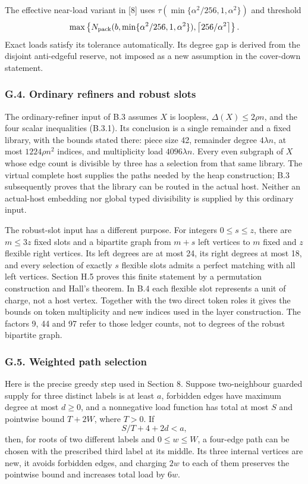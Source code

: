 \documentclass[english,11pt,a4paper]{article}
\begin{document}
The effective near-load variant in {[}8{]} uses \(\tau(\min\{\alpha^2/256,1,\alpha^2\})\) and threshold \[\max\left\{N_{\rm pack}(b,\min\{\alpha^2/256,1,\alpha^2\}),
\left\lceil256/\alpha^2\right\rceil\right\}.\] Exact loads satisfy its tolerance automatically. Its degree gap is derived from the disjoint anti-edgeful reserve, not imposed as a new assumption in the cover-down statement.

\subsubsection{G.4. Ordinary refiners and robust slots}\label{g.4.-ordinary-refiners-and-robust-slots}

The ordinary-refiner input of B.3 assumes \(X\) is loopless, \(\Delta(X)\le2\rho n\), and the four scalar inequalities (B.3.1). Its conclusion is a single remainder and a fixed library, with the bounds stated there: piece size 42, remainder degree \(4\lambda n\), at most \(1224\rho n^2\) indices, and multiplicity load \(4096\lambda n\). Every even subgraph of \(X\) whose edge count is divisible by three has a selection from that same library. The virtual complete host supplies the paths needed by the heap construction; B.3 subsequently proves that the library can be routed in the actual host. Neither an actual-host embedding nor global typed divisibility is supplied by this ordinary input.

The robust-slot input has a different purpose. For integers \(0\le s\le z\), there are \(m\le3z\) fixed slots and a bipartite graph from \(m+s\) left vertices to \(m\) fixed and \(z\) flexible right vertices. Its left degrees are at most 24, its right degrees at most 18, and every selection of exactly \(s\) flexible slots admits a perfect matching with all left vertices. Section H.5 proves this finite statement by a permutation construction and Hall's theorem. In B.4 each flexible slot represents a unit of charge, not a host vertex. Together with the two direct token roles it gives the bounds on token multiplicity and new indices used in the layer construction. The factors 9, 44 and 97 refer to those ledger counts, not to degrees of the robust bipartite graph.

\subsubsection{G.5. Weighted path selection}\label{g.5.-weighted-path-selection}

Here is the precise greedy step used in Section 8. Suppose two-neighbour guarded supply for three distinct labels is at least \(a\), forbidden edges have maximum degree at most \(d\ge0\), and a nonnegative load function has total at most \(S\) and pointwise bound \(T+2W\), where \(T>0\). If \[S/T+4+2d<a,\] then, for roots of two different labels and \(0\le w\le W\), a four-edge path can be chosen with the prescribed third label at its middle. Its three internal vertices are new, it avoids forbidden edges, and charging \(2w\) to each of them preserves the pointwise bound and increases total load by \(6w\).
\end{document}
